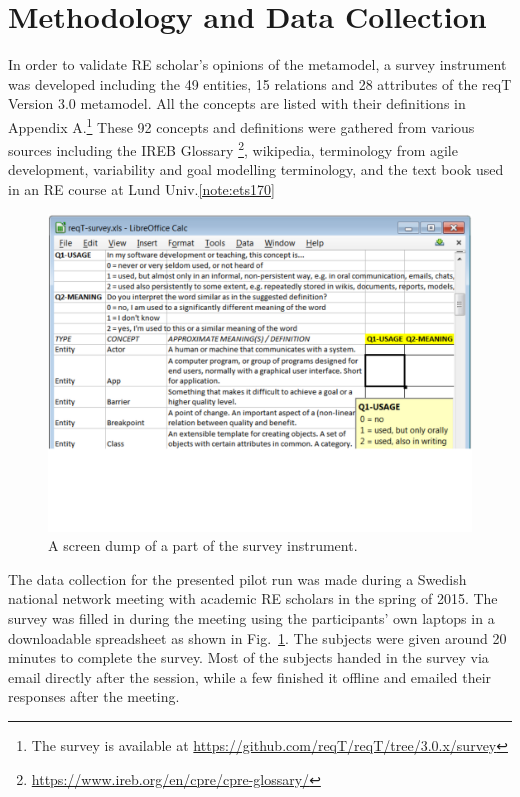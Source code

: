 \documentclass[a4paper]{llncs}
\begin{document}
\section{Methodology and Data Collection}
In order to validate RE scholar's opinions of the metamodel, a survey instrument was developed including the 49 entities, 15 relations and 28 attributes of the reqT Version 3.0 metamodel. All the concepts are listed with their definitions in Appendix A.\footnote{The survey is available at \scriptsize\url{https://github.com/reqT/reqT/tree/3.0.x/survey}} These 92 concepts and definitions were gathered from various sources including the IREB Glossary \footnote{\scriptsize\url{https://www.ireb.org/en/cpre/cpre-glossary/}}, wikipedia, terminology from agile development, variability \cite{metzger2007variability} and goal modelling terminology, and the text book\cite{Lauesen2002} used in an RE course at Lund Univ.\cref{note:ets170} 
\vspace{-0.2cm}
\begin{figure}[h]
\centering
\includegraphics[width=\textwidth]{img/survey-screen-dump}
\caption{A screen dump of a part of the survey instrument.}
\label{fig:survey}
\end{figure}

\noindent The data collection for the presented pilot run was made during a Swedish national network meeting with academic RE scholars in the spring of 2015. The survey was filled in during the meeting using the participants' own laptops  in a downloadable spreadsheet as shown in Fig.~\ref{fig:survey}. The subjects were given around 20 minutes to complete the survey. Most of the subjects handed in the survey via email directly after the session, while a few finished it offline and emailed their responses after the meeting. 
\end{document}
